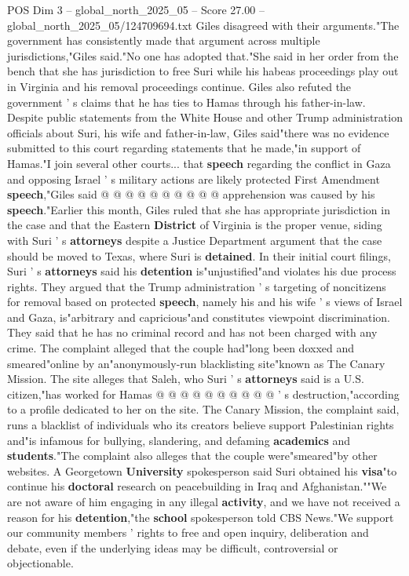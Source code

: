 \begin{textsample}{POS Dim 3 – global\_north\_2025\_05 – Score 27.00 – global\_north\_2025\_05/124709694.txt}
Giles disagreed with their arguments."The government has consistently made that argument across multiple jurisdictions,"Giles said."No one has adopted that."She said in her order from the bench that she has jurisdiction to free Suri while his habeas proceedings play out in Virginia and his removal proceedings continue.
Giles also refuted the government ' s claims that he has ties to Hamas through his father-in-law.
Despite public statements from the White House and other Trump administration officials about Suri, his wife and father-in-law, Giles said"there was no evidence submitted to this court regarding statements that he made,"in support of Hamas."I join several other courts... that \textbf{speech} regarding the conflict in Gaza and opposing Israel ' s military actions are likely protected First Amendment \textbf{speech},"Giles said @ @ @ @ @ @ @ @ @ @ apprehension was caused by his \textbf{speech}."Earlier this month, Giles ruled that she has appropriate jurisdiction in the case and that the Eastern \textbf{District} of Virginia is the proper venue, siding with Suri ' s \textbf{attorneys} despite a Justice Department argument that the case should be moved to Texas, where Suri is \textbf{detained}.
In their initial court filings, Suri ' s \textbf{attorneys} said his \textbf{detention} is"unjustified"and violates his due process rights.
They argued that the Trump administration ' s targeting of noncitizens for removal based on protected \textbf{speech}, namely his and his wife ' s views of Israel and Gaza, is"arbitrary and capricious"and constitutes viewpoint discrimination.
They said that he has no criminal record and has not been charged with any crime.
The complaint alleged that the couple had"long been doxxed and smeared"online by an"anonymously-run blacklisting site"known as The Canary Mission.
The site alleges that Saleh, who Suri ' s \textbf{attorneys} said is a U.S. citizen,"has worked for Hamas @ @ @ @ @ @ @ @ @ @ ' s destruction,"according to a profile dedicated to her on the site.
The Canary Mission, the complaint said, runs a blacklist of individuals who its creators believe support Palestinian rights and"is infamous for bullying, slandering, and defaming \textbf{academics} and \textbf{students}."The complaint also alleges that the couple were"smeared"by other websites.
A Georgetown \textbf{University} spokesperson said Suri obtained his \textbf{visa}"to continue his \textbf{doctoral} research on peacebuilding in Iraq and Afghanistan.""We are not aware of him engaging in any illegal \textbf{activity}, and we have not received a reason for his \textbf{detention},"the \textbf{school} spokesperson told CBS News."We support our community members ' rights to free and open inquiry, deliberation and debate, even if the underlying ideas may be difficult, controversial or objectionable.

\end{textsample}
